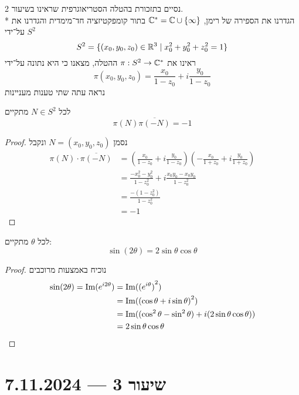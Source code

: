 נסיים בתזכורת בהטלה הסטריאוגרפית שראינו בשיעור 2. \\*
הגדרנו את הספירה של רימן, $\mathbb{C}^* = \mathbb{C} \cup \{ \infty \}$ בתור קומפקטיזציה חד־מימדית והגדרנו את $S^2$ על־ידי
\[
	S^2 = \{ (x_0, y_0, z_0) \in \mathbb{R}^3 \mid x_0^2 + y_0^2 + z_0^2 = 1 \}
\]
ראינו את $\pi : S^2 \to \mathbb{C}^*$ ההטלה, מצאנו כי היא נתונה על־ידי
\[
	\pi(x_0, y_0, z_0) = \frac{x_0}{1 - z_0} + i \frac{y_0}{1 - z_0}
\]
נראה עתה שתי טענות מעניינות
\begin{proposition}
	לכל $N \in S^2$ מתקיים
	\[
		\pi(N) \overline{\pi(-N)} = -1
	\]
\end{proposition}
\begin{proof}
	נסמן $N = (x_0, y_0, z_0)$ ונקבל
	\begin{align*}
		\pi(N) \cdot \overline{\pi(-N)}
		& = \left(\frac{x_0}{1 - z_0} + i \frac{y_0}{1 - z_0}\right) \left(-\frac{x_0}{1 + z_0} + i \frac{y_0}{1 + z_0}\right) \\
		& = \frac{-x_0^2 - y_0^2}{1 - z_0^2} + i \frac{x_0 y_0 - x_0 y_0}{1 - z_0^2} \\
		& = \frac{-(1 - z_0^2)}{1 - z_0^2} \\
		& = -1
	\end{align*}
\end{proof}
\begin{proposition}
	לכל $\theta$ מתקיים:
	\[
		\sin(2\theta) = 2 \sin \theta \cos \theta
	\]
\end{proposition}
\begin{proof}
	נוכיח באמצעות מרוכבים
	\begin{align*}
		\sin(2\theta) = \operatorname{Im}(e^{i2\theta})
		& = \operatorname{Im}({(e^{i\theta})}^2) \\
		& = \operatorname{Im}({(\cos\theta + i \sin \theta)}^2) \\
		& = \operatorname{Im}((\cos^2 \theta - \sin^2 \theta) + i (2\sin\theta \cos \theta)) \\
		& = 2 \sin \theta \cos \theta
	\end{align*}
\end{proof}

\section{שיעור 3 --- 7.11.2024}
